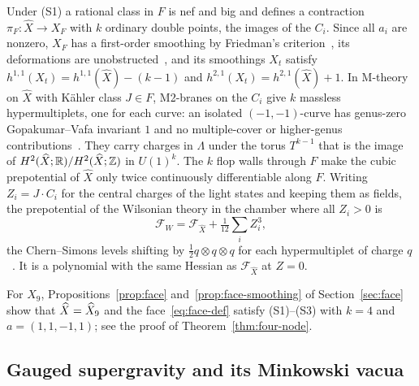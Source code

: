 Under (S1) a rational class in $F$ is nef and big and defines a contraction
$\pi_F:\widehat X\to X_F$ with $k$ ordinary double points, the images of the $C_i$. Since all
$a_i$ are nonzero, $X_F$ has a first-order smoothing by Friedman's
criterion~\cite{Friedman:1986}, its deformations are unobstructed~\cite{Gross:1997}, and its smoothings $X_t$ satisfy
$h^{1,1}(X_t)=h^{1,1}(\widehat X)-(k-1)$ and $h^{2,1}(X_t)=h^{2,1}(\widehat X)+1$. In M-theory on
$\widehat X$ with K\"ahler class $J\in F$, M2-branes on the $C_i$ give $k$ massless
hypermultiplets, one for each curve: an isolated $(-1,-1)$-curve has genus-zero
Gopakumar--Vafa invariant $1$ and no multiple-cover or higher-genus
contributions~\cite{FaberPandharipande:2000,BryanKatzLeung:2001}. They carry charges in
$\Lambda$ under the torus $T^{k-1}$ that is the image of $H^2(\widehat X;\mathbb R)/H^2(\widehat
X;\mathbb Z)$ in $U(1)^k$. The $k$ flop walls through $F$ make the cubic prepotential of $\widehat X$
only twice continuously differentiable along $F$. Writing $Z_i=J\cdot C_i$ for the central charges of the light states and
keeping them as fields, the prepotential of the Wilsonian theory in the chamber where all
$Z_i>0$ is
\begin{equation}
 \mathcal F_W=\mathcal F_{\widehat X}+\tfrac1{12}\textstyle\sum_iZ_i^3,
 \label{eq:wilsonian-F}
\end{equation}
the Chern--Simons levels shifting by $\frac12q\otimes q\otimes q$ for each hypermultiplet of
charge $q$~\cite{Witten:1996qb,Intriligator:1997}. It is a polynomial with the same Hessian as
$\mathcal F_{\widehat X}$ at $Z=0$.

For $X_9$, Propositions~\ref{prop:face} and~\ref{prop:face-smoothing} of
Section~\ref{sec:face} show that $\widehat X=\widehat X_9$ and the face~\eqref{eq:face-def} satisfy
(S1)--(S3) with $k=4$ and $a=(1,1,-1,1)$; see the proof of Theorem~\ref{thm:four-node}.

\subsection{Gauged supergravity and its Minkowski vacua}
\label{subsec:sugra}

